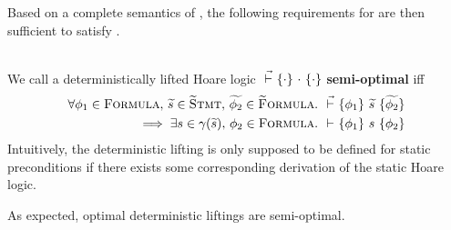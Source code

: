 Based on a complete semantics of \svl, the following requirements for \gvl are then sufficient to satisfy .
\begin{definition}
    \label{def:perf-stat}~\\
    We call a deterministically lifted Hoare logic ${} \,\,\vec{\vdash}\,\, \{{\cdot}\} ~{\cdot}~ \{{\cdot}\}$ \textbf{semi-optimal} iff
    \begin{align*}
    \forall \phi_1 \in \textup{\textsc{Formula}},\, \widetilde{s} \in \textup{\textsc{\ensuremath{\widetilde{\text{S}}}tmt}},\, \widetilde{\phi_2} \in \textup{\textsc{\ensuremath{\widetilde{\text{F}}}ormula}}.&~ {} \,\,\vec{\vdash}\,\, \{{\phi_1}\} ~{\widetilde{s}}~ \{{\widetilde{\phi_2}}\}\\ \implies \exists s \in \gamma(\widetilde{s}),\, \phi_2 \in \textup{\textsc{Formula}}.&~ {} \,\,{\vdash}\,\, \{{\phi_1}\} ~{s}~ \{{\phi_2}\}
    \end{align*}
    Intuitively, the deterministic lifting is only supposed to be defined for static preconditions if there exists some corresponding derivation of the static Hoare logic.
    
    As expected, optimal deterministic liftings are semi-optimal.
\end{definition}

